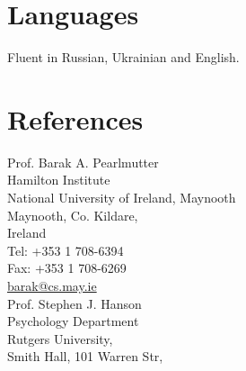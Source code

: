 \documentclass[12pt,overlapped,line]{res}
\begin{document}
\begin{resume}
\section{Languages}
 Fluent in Russian, Ukrainian and English.

\pagebreak
 \section{References}

 \vspace{0em}
  \begin{multicols}{2}
 {\small
    Prof. Barak A. Pearlmutter \\
    Hamilton Institute \\
    National University of Ireland, Maynooth \\
    Maynooth, Co. Kildare, \\
    Ireland \\
    Tel: +353 1 708-6394\\
    Fax: +353 1 708-6269\\
    \url{barak@cs.may.ie} \\
    Prof. Stephen J. Hanson \\
    Psychology Department \\
    Rutgers University, \\
    Smith Hall, 101 Warren Str, \\
}
\end{multicols}
\end{resume}
\end{document}

